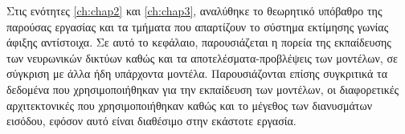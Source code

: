 \noindent
Στις ενότητες \ref{ch:chap2} και \ref{ch:chap3}, αναλύθηκε το θεωρητικό υπόβαθρο της παρούσας εργασίας και τα τμήματα που απαρτίζουν το σύστημα εκτίμησης γωνίας άφιξης αντίστοιχα. Σε αυτό το κεφάλαιο, παρουσιάζεται η πορεία της εκπαίδευσης των νευρωνικών δικτύων καθώς και τα αποτελέσματα-προβλέψεις των μοντέλων, σε σύγκριση με άλλα ήδη υπάρχοντα μοντέλα. Παρουσιάζονται επίσης συγκριτικά τα δεδομένα που χρησιμοποιήθηκαν για την εκπαίδευση των μοντέλων, οι διαφορετικές αρχιτεκτονικές που χρησιμοποιήθηκαν καθώς και το μέγεθος των διανυσμάτων εισόδου, εφόσον αυτό είναι διαθέσιμο στην εκάστοτε εργασία.


